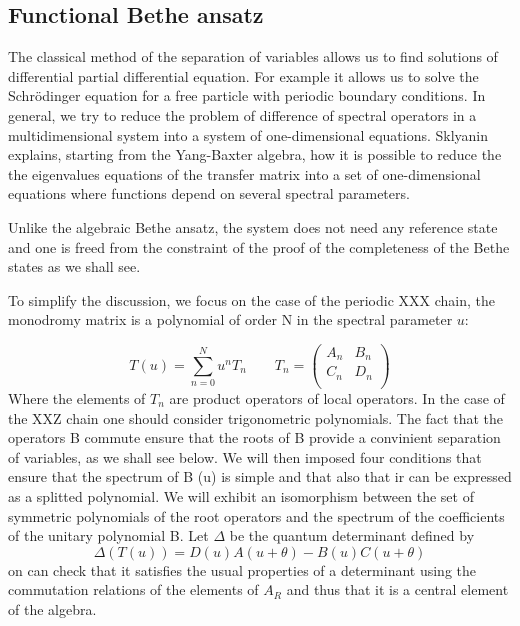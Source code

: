 \documentclass[12pt]{article}
\begin{document}
\subsection{Functional Bethe ansatz}

The classical method of the separation of variables allows us to find solutions of differential partial differential equation. For example it allows us to solve the Schrödinger equation for a free particle with periodic boundary conditions. In general, we try to reduce the problem of difference of spectral operators in a multidimensional system into  a system of one-dimensional equations. Sklyanin explains, starting from the Yang-Baxter algebra, how it is possible to reduce the the eigenvalues equations ​​of the transfer matrix into a set of one-dimensional equations where functions depend on several spectral parameters. 

Unlike the algebraic Bethe ansatz, the system does not need any reference state and one is freed from the constraint of the proof of the completeness of the Bethe states as we shall see. 

To simplify the discussion, we focus on the case of the periodic XXX chain, the monodromy matrix is a polynomial of order N in the spectral parameter $u$:

   
\begin{equation}
T(u)=\sum_{n=0}^{N} u^{n} T_{n} \qquad
T_{n}= \begin{pmatrix}
A_{n} & B_{n}\\
C_{n} & D_{n} \\
\end{pmatrix}
\end{equation}
Where the elements of $ T_ {n} $ are product operators of local operators. In the case of the XXZ chain one should consider trigonometric polynomials. The fact that the operators B commute ensure that the roots of B provide a convinient separation of variables, as we shall see below. We will then imposed four conditions that ensure that the spectrum of B (u) is simple and that also that ir can be expressed as a splitted polynomial. We will exhibit an isomorphism between the set of symmetric polynomials of the root operators and the spectrum of the coefficients of the unitary polynomial B. 
Let $ \Delta $ be the quantum determinant defined by $$ \Delta(T (u)) = D (u) A (u + \theta)-B (u) C (u + \theta) $$on can check that it satisfies the usual properties of a determinant using the commutation relations of the elements of $ A_ {R} $ and thus that it is a central element of the algebra.
\end{document}
